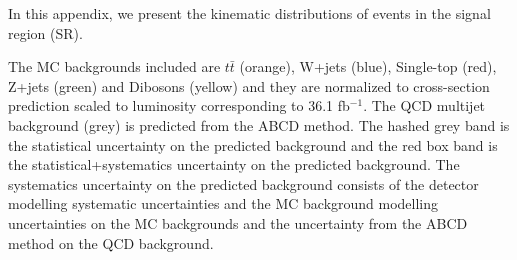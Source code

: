 In this appendix, we present the kinematic distributions of events in the signal region (SR).

The MC backgrounds included are $t\bar{t}$ (orange), W+jets (blue), Single-top (red), Z+jets (green) and Dibosons (yellow) 
and they are normalized to cross-section prediction scaled to luminosity corresponding to 36.1 fb$^{-1}$. The QCD multijet 
background (grey) is predicted from the ABCD method. The hashed grey band is the statistical uncertainty on 
the predicted background and the red box band is the statistical+systematics uncertainty on the predicted background. 
The systematics uncertainty on the predicted background consists of the detector modelling systematic uncertainties and the 
MC background modelling uncertainties on the MC backgrounds and the uncertainty from the ABCD method on the QCD background.

